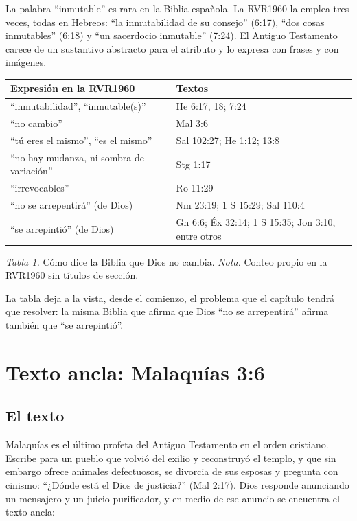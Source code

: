 La palabra ``inmutable'' es rara en la Biblia española. La RVR1960 la emplea tres veces, todas en Hebreos: ``la inmutabilidad de su consejo'' (6:17), ``dos cosas inmutables'' (6:18) y ``un sacerdocio inmutable'' (7:24). El Antiguo Testamento carece de un sustantivo abstracto para el atributo y lo expresa con frases y con imágenes.

\begin{center}\small\renewcommand{\arraystretch}{1.18}
\begin{tabular}{@{}L{5.6cm}L{8.2cm}@{}}
\toprule
\textbf{Expresión en la RVR1960} & \textbf{Textos} \\ \midrule
``inmutabilidad'', ``inmutable(s)'' & He 6:17, 18; 7:24 \\
``no cambio'' & Mal 3:6 \\
``tú eres el mismo'', ``es el mismo'' & Sal 102:27; He 1:12; 13:8 \\
``no hay mudanza, ni sombra de variación'' & Stg 1:17 \\
``irrevocables'' & Ro 11:29 \\
``no se arrepentirá'' (de Dios) & Nm 23:19; 1 S 15:29; Sal 110:4 \\
``se arrepintió'' (de Dios) & Gn 6:6; Éx 32:14; 1 S 15:35; Jon 3:10, entre otros \\
\bottomrule
\end{tabular}\par
{\footnotesize\color{gris}\textit{Tabla 1.} Cómo dice la Biblia que Dios no cambia. \textit{Nota.} Conteo propio en la RVR1960 sin títulos de sección.}
\end{center}

La tabla deja a la vista, desde el comienzo, el problema que el capítulo tendrá que resolver: la misma Biblia que afirma que Dios ``no se arrepentirá'' afirma también que ``se arrepintió''.

\section{Texto ancla: Malaquías 3:6}

\subsection{El texto}
Malaquías es el último profeta del Antiguo Testamento en el orden cristiano. Escribe para un pueblo que volvió del exilio y reconstruyó el templo, y que sin embargo ofrece animales defectuosos, se divorcia de sus esposas y pregunta con cinismo: ``¿Dónde está el Dios de justicia?'' (Mal 2:17). Dios responde anunciando un mensajero y un juicio purificador, y en medio de ese anuncio se encuentra el texto ancla:

